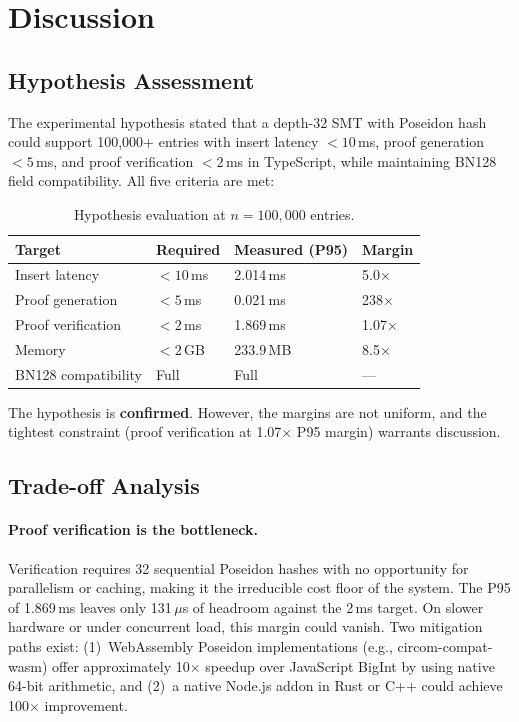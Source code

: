 
\section{Discussion}
\label{sec:discussion}

\subsection{Hypothesis Assessment}

The experimental hypothesis stated that a depth-32 SMT with Poseidon hash could support 100{,}000+ entries with insert latency $< 10$\,ms, proof generation $< 5$\,ms, and proof verification $< 2$\,ms in TypeScript, while maintaining BN128 field compatibility. All five criteria are met:

\begin{table}[htbp]
\centering
\caption{Hypothesis evaluation at $n = 100{,}000$ entries.}
\label{tab:hypothesis}
\begin{tabular}{llll}
\hline
\textbf{Target} & \textbf{Required} & \textbf{Measured (P95)} & \textbf{Margin} \\
\hline
Insert latency & $< 10$\,ms & 2.014\,ms & 5.0$\times$ \\
Proof generation & $< 5$\,ms & 0.021\,ms & 238$\times$ \\
Proof verification & $< 2$\,ms & 1.869\,ms & 1.07$\times$ \\
Memory & $< 2$\,GB & 233.9\,MB & 8.5$\times$ \\
BN128 compatibility & Full & Full & --- \\
\hline
\end{tabular}
\end{table}

The hypothesis is \textbf{confirmed}. However, the margins are not uniform, and the tightest constraint (proof verification at 1.07$\times$ P95 margin) warrants discussion.

\subsection{Trade-off Analysis}

\paragraph{Proof verification is the bottleneck.} Verification requires 32 sequential Poseidon hashes with no opportunity for parallelism or caching, making it the irreducible cost floor of the system. The P95 of 1.869\,ms leaves only 131\,$\mu$s of headroom against the 2\,ms target. On slower hardware or under concurrent load, this margin could vanish. Two mitigation paths exist: (1)~WebAssembly Poseidon implementations (e.g., circom-compat-wasm) offer approximately 10$\times$ speedup over JavaScript BigInt by using native 64-bit arithmetic, and (2)~a native Node.js addon in Rust or C++ could achieve 100$\times$ improvement.

